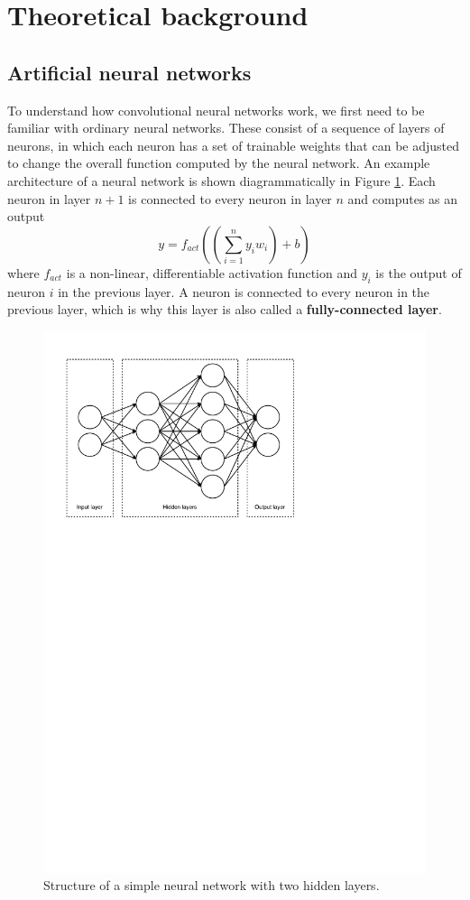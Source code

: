 \documentclass[12pt,a4paper,twoside,openright]{report}
\begin{document}
\section{Theoretical background}
\subsection{Artificial neural networks}
To understand how convolutional neural networks work, we first need to be familiar with ordinary neural networks. These consist of a sequence of layers of neurons, in which each neuron has a set of trainable weights that can be adjusted to change the overall function computed by the neural network. An example architecture of a neural network is shown diagrammatically in Figure \ref{fig:nn_layout}. Each neuron in layer $n+1$ is connected to every neuron in layer $n$ and computes as an output
\[y = f_{act}((\sum_{i=1}^{n} y_i w_i) + b)\]
where $f_{act}$ is a non-linear, differentiable activation function and $y_i$ is the output of neuron $i$ in the previous layer. A neuron is connected to every neuron in the previous layer, which is why this layer is also called a \textbf{fully-connected layer}.

\begin{figure}
	\centering
	\includegraphics[scale=0.6]{nn_layout}
	\caption{Structure of a simple neural network with two hidden layers.}
	\label{fig:nn_layout}
\end{figure}
\end{document}
